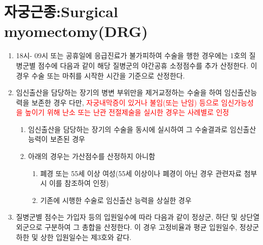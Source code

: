 \section{자궁근종:Surgical myomectomy(DRG)}
%
{
\begin{enumerate}\tightlist
\item 18시- 09시 또는 공휴일에 응급진료가 불가피하여 수술을 행한 경우에는 1호의 질병군별 점수에 다음과 같이 해당 질병군의 야간\bullet 공휴 소정점수를 추가
산정한다. 이 경우 수술 또는 마취를 시작한 시간을 기준으로 산정한다.
\item  임신\bullet 출산을 담당하는 장기의 병변 부위만을 제거\bullet 교정하는 수술을 하여 임신\bullet 출산능력을 보존한 경우  다만, \textcolor{red}{자궁내막증이 있거나 불임(또는 난임) 등으로 임신가능성을 높이기 위해 난소 또는 난관 전절제술을 실시한 경우는 사례별로 인정}
	\begin{enumerate}[가.]\tightlist	
	\item 임신\bullet 출산을 담당하는 장기의 수술을 동시에 실시하여 그 수술결과로 임신\bullet 출산능력이 보존된 경우
	\item 아래의 경우는 가산점수를 산정하지 아니함
		\begin{enumerate}[(1)]\tightlist
		\item  폐경 또는 55세 이상 여성(55세 이상이나 폐경이 아닌 경우 관련자료 첨부시 이를 참조하여 인정)
		\item  기존에 시행한 수술로 임신\bullet 출산 능력을 상실한 경우
		\end{enumerate}
	\end{enumerate}
\item 질병군별 점수는 가입자 등의 입원일수에 따라 다음과 같이 정상군, 하단 및 상단열외군으로 구분하여 그 총합을 산정한다. 이 경우 고정비율과 평균
입원일수, 정상군 하한 및 상한 입원일수는 제3호와 같다.	
\end{enumerate}
}

